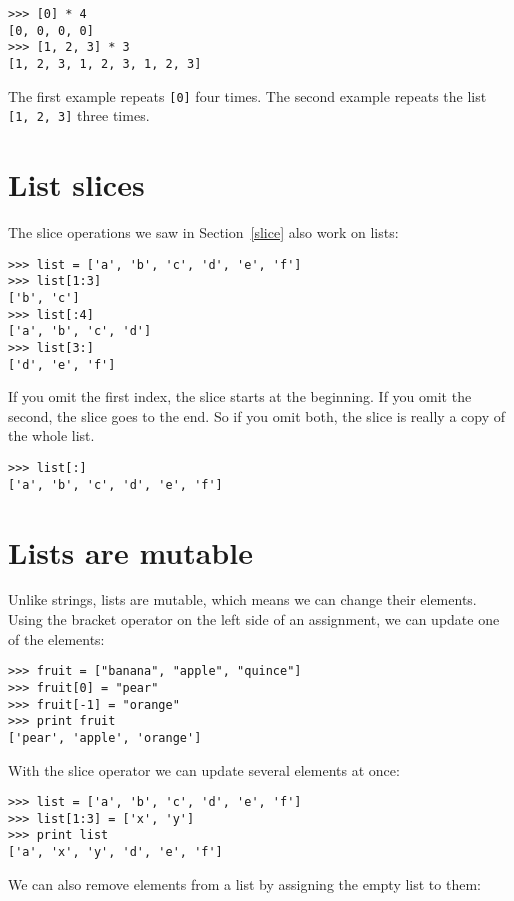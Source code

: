 
\beforeverb
\begin{verbatim}
>>> [0] * 4
[0, 0, 0, 0]
>>> [1, 2, 3] * 3
[1, 2, 3, 1, 2, 3, 1, 2, 3]
\end{verbatim}
\afterverb
%
The first example repeats {\tt [0]} four times.  The second example
repeats the list {\tt [1, 2, 3]} three times.


\section{List slices}

The slice operations we saw in Section~\ref{slice}
also work on lists:

\beforeverb
\begin{verbatim}
>>> list = ['a', 'b', 'c', 'd', 'e', 'f']
>>> list[1:3]
['b', 'c']
>>> list[:4]
['a', 'b', 'c', 'd']
>>> list[3:]
['d', 'e', 'f']
\end{verbatim}
\afterverb
%
If you omit the first index, the slice starts at the beginning.
If you omit the second, the slice goes to the end.  So if you
omit both, the slice is really a copy of the whole list.

\beforeverb
\begin{verbatim}
>>> list[:]
['a', 'b', 'c', 'd', 'e', 'f']
\end{verbatim}
\afterverb
%


\section{Lists are mutable}

Unlike strings, lists are mutable, which means we can change
their elements.  Using the bracket operator on the left side
of an assignment, we can update one of the elements:

\beforeverb
\begin{verbatim}
>>> fruit = ["banana", "apple", "quince"]
>>> fruit[0] = "pear"
>>> fruit[-1] = "orange"
>>> print fruit
['pear', 'apple', 'orange']
\end{verbatim}
\afterverb
%
With the slice operator we can update several elements at once:

\beforeverb
\begin{verbatim}
>>> list = ['a', 'b', 'c', 'd', 'e', 'f']
>>> list[1:3] = ['x', 'y']
>>> print list
['a', 'x', 'y', 'd', 'e', 'f']
\end{verbatim}
\afterverb
%
We can also remove elements from a list by assigning the empty list to
them:

